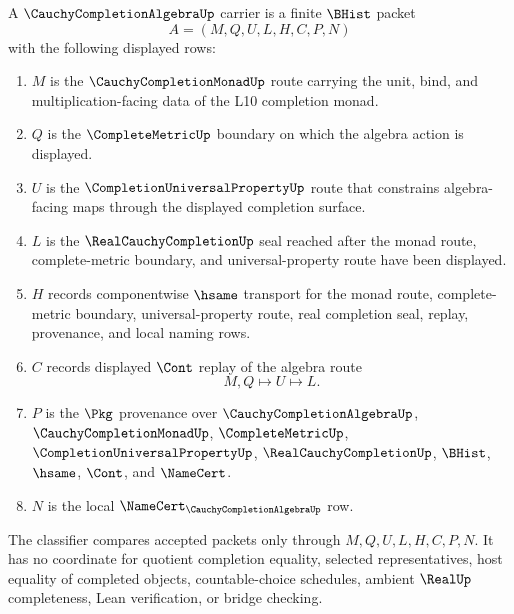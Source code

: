 \begin{definition}
\label{def:cauchy-completion-algebra-carrier}
A $\CauchyCompletionAlgebraUp$ carrier is a finite $\BHist$ packet
$$
A=(M,Q,U,L,H,C,P,N)
$$
with the following displayed rows:
\begin{enumerate}
\item $M$ is the $\CauchyCompletionMonadUp$ route carrying the unit, bind, and multiplication-facing data of the L10 completion monad.
\item $Q$ is the $\CompleteMetricUp$ boundary on which the algebra action is displayed.
\item $U$ is the $\CompletionUniversalPropertyUp$ route that constrains algebra-facing maps through the displayed completion surface.
\item $L$ is the $\RealCauchyCompletionUp$ seal reached after the monad route, complete-metric boundary, and universal-property route have been displayed.
\item $H$ records componentwise $\hsame$ transport for the monad route, complete-metric boundary, universal-property route, real completion seal, replay, provenance, and local naming rows.
\item $C$ records displayed $\Cont$ replay of the algebra route
$$
M,Q \longmapsto U \longmapsto L .
$$
\item $P$ is the $\Pkg$ provenance over $\CauchyCompletionAlgebraUp$, $\CauchyCompletionMonadUp$, $\CompleteMetricUp$, $\CompletionUniversalPropertyUp$, $\RealCauchyCompletionUp$, $\BHist$, $\hsame$, $\Cont$, and $\NameCert$.
\item $N$ is the local $\NameCert_{\CauchyCompletionAlgebraUp}$ row.
\end{enumerate}
The classifier compares accepted packets only through $M,Q,U,L,H,C,P,N$. It has no coordinate for quotient completion equality, selected representatives, host equality of completed objects, countable-choice schedules, ambient $\RealUp$ completeness, Lean verification, or bridge checking.
\end{definition}

